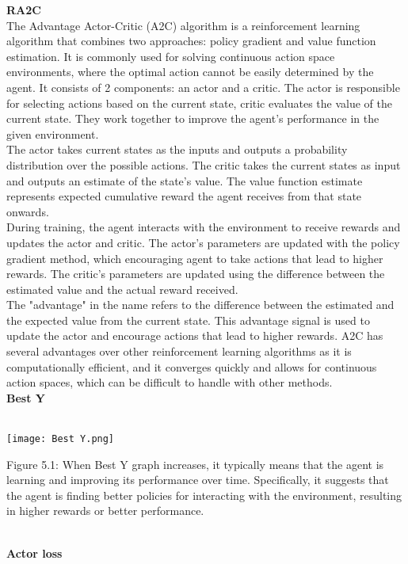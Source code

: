 \documentclass[conference]{IEEEtran}
\begin{document}
\textbf{RA2C}\\
The Advantage Actor-Critic (A2C) algorithm is a reinforcement learning algorithm that combines two approaches: policy gradient and value function estimation. It is commonly used for solving continuous action space environments, where the optimal action cannot be easily determined by the agent. It consists of 2 components: an actor and a critic. The actor is responsible for selecting actions based on the current state, critic evaluates the value of the current state. They work together to improve the agent's performance in the given environment.\\
The actor takes current states as the inputs and outputs a probability distribution over the possible actions. The critic takes the current states as input and outputs an estimate of the state's value. The value function estimate represents expected cumulative reward the agent receives from that state onwards.\\
During training, the agent interacts with the environment to receive rewards and updates the actor and critic. The actor's parameters are updated with the policy gradient method, which encouraging agent to take actions that lead to higher rewards. The critic's parameters are updated using the difference between the estimated value and the actual reward received.\\
The "advantage" in the name refers to the difference between the estimated and the expected value from the current state. This advantage signal is used to update the actor and encourage actions that lead to higher rewards. A2C has several advantages over other reinforcement learning algorithms as it is computationally efficient, and it converges quickly and allows for continuous action spaces, which can be difficult to handle with other methods.\\


\textbf{Best Y}\\

\\
\graphicspath{ {./images/} }
\texttt{[image: Best Y.png]}
\caption{Figure 5.1: When Best Y graph increases, it typically means that the agent is learning and improving its performance over time. Specifically, it suggests that the agent is finding better policies for interacting with the environment, resulting in higher rewards or better performance.
\\ }\\


\textbf{Actor loss}\\
\end{document}
